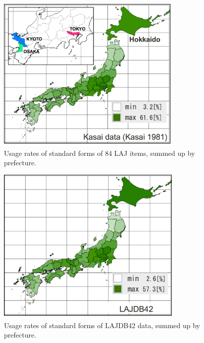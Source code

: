 \documentclass[output=paper]{LSP/langsci}
\begin{document}
\begin{figure}
\includegraphics[width=0.8\textwidth]{illustrations/kuma_fig03}
\caption{Usage rates of standard forms of 84 LAJ items, summed up by prefecture.}          
\label{fig:3}
\end{figure} 
\begin{figure}
\includegraphics[width=0.8\textwidth]{illustrations/kuma_fig04}
\caption{Usage rates of standard forms of LAJDB42 data, summed up by prefecture.}          
\label{fig:4}
\end{figure} 
\end{document}
